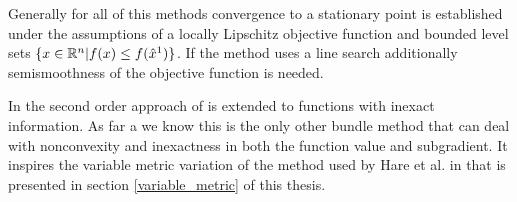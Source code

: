 Generally for all of this methods convergence to a stationary point is established under the assumptions of a locally Lipschitz objective function and bounded level sets \(\{x \in \mathbb{R}^n | f(x) \leq f(\hat{x}^1)\}\).
If the method uses a line search additionally semismoothness of the objective function is needed.

In \cite{Noll2013} the second order approach of \cite{Noll2012} is extended to functions with inexact information.
As far a we know this is the only other bundle method that can deal with nonconvexity and inexactness in both the function value and subgradient. It inspires the variable metric variation of the method used by Hare et al. in \cite{Hare2016} that is presented in section \ref{variable_metric} of this thesis.

